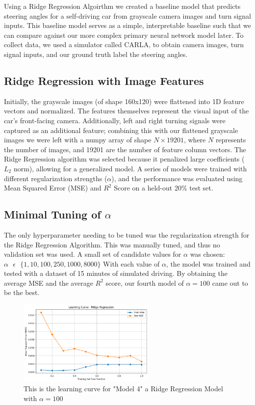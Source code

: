 \documentclass{article} %
\begin{document}
Using a Ridge Regression Algoirthm we created a baseline model that predicts steering angles for a self-driving car 
from grayscale camera images and turn signal inputs. This baseline model serves as a simple, interpretable baseline
such that we can compare against our more complex primary neural network model later. To collect data, we used a simulator
called CARLA, to obtain camera images, turn signal inputs, and our ground truth label the steering angles.


\subsection{Ridge Regression with Image Features}

Initially, the grayscale images (of shape 160x120) were flattened into 1D feature vectors and normalized. The features themselves
represent the visual input of the car's front-facing camera. Additionally, left and right turning signals were captured as an
additional feature; combining this with our flattened grayscale images we were left with a numpy array of shape $N \times 19201$,
where $N$ represents the number of images, and 19201 are the number of feature column vectors. The Ridge Regression algorithm was
selected because it penalized large coefficients ($L_2$ norm), allowing for a generalized model. A series of models were trained
with different regularization strengths ($\alpha$), and the performance was evaluated using Mean Squared Error (MSE) and $R^2$ Score
on a held-out 20\% test set.

\subsection{Minimal Tuning of $\alpha$}
The only hyperparameter needing to be tuned was the regularization strength for the Ridge Regression Algorithm. This was manually tuned,
and thus no validation set was used. A small set of candidate values for $\alpha$ was chosen: $\alpha \text{ } \epsilon \text{ } 
\{ 1, 10, 100, 250, 1000, 8000\}$ With each value of $\alpha$, the model was trained and tested with a dataset of 15 minutes of simulated
driving. By obtaining the average MSE and the average $R^2$ score, our fourth model of $\alpha = 100$ came out to be the best. 


\begin{figure}[H] %
    \centering
    \includegraphics[width=0.6\textwidth]{model4learningcurve.png} %
    \caption{This is the learning curve for "Model 4" a Ridge Regression Model with $\alpha = 100$}
    \label{fig:model4learningcurve}
\end{figure}
\end{document}

